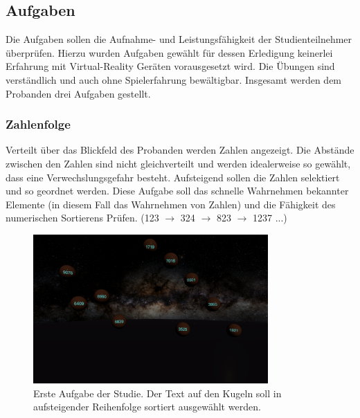 \subsection{Aufgaben}
Die Aufgaben sollen die Aufnahme- und Leistungsfähigkeit der Studienteilnehmer überprüfen. Hierzu wurden Aufgaben gewählt für dessen Erledigung keinerlei Erfahrung mit Virtual-Reality Geräten vorausgesetzt wird. Die Übungen sind verständlich und auch ohne Spielerfahrung bewältigbar.
Insgesamt werden dem Probanden drei Aufgaben gestellt. 
 

\subsubsection{Zahlenfolge} 
Verteilt über das Blickfeld des Probanden werden Zahlen angezeigt. Die Abstände zwischen den Zahlen sind nicht gleichverteilt und werden idealerweise so gewählt, dass eine Verwechslungsgefahr besteht. Aufsteigend sollen die Zahlen selektiert und so geordnet werden. Diese Aufgabe soll das schnelle Wahrnehmen bekannter Elemente (in diesem Fall das Wahrnehmen von Zahlen) und die Fähigkeit des numerischen Sortierens Prüfen. 
(123 $\rightarrow$ 324 $\rightarrow$ 823 $\rightarrow$ 1237 ...)

\begin{figure}
	\centering
	\includegraphics[width=0.8\textwidth]{./images/ordering.png}
	\caption{Erste Aufgabe der Studie. Der Text auf den Kugeln soll in aufsteigender Reihenfolge sortiert ausgewählt werden.}
	\label{fig:ordeing}
\end{figure}

